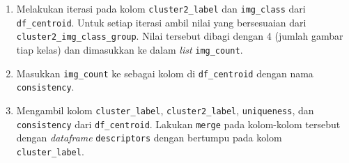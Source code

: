 \begin{enumerate}
	\item Melakukan iterasi pada kolom \texttt{cluster2\_label} dan \texttt{img\_class} dari \texttt{df\_centroid}. Untuk setiap iterasi ambil nilai yang bersesuaian dari \texttt{cluster2\_img\_class\_group}. Nilai tersebut dibagi dengan 4 (jumlah gambar tiap kelas) dan dimasukkan ke dalam \textit{list} \texttt{img\_count}.
	\item Masukkan \texttt{img\_count} ke sebagai kolom di \texttt{df\_centroid} dengan nama \texttt{consistency}.
	\item Mengambil kolom \texttt{cluster\_label}, \texttt{cluster2\_label}, \texttt{uniqueness}, dan \texttt{consistency} dari \texttt{df\_centroid}. Lakukan \texttt{merge} pada kolom-kolom tersebut dengan \textit{dataframe} \texttt{descriptors} dengan bertumpu pada kolom \texttt{cluster\_label}.
\end{enumerate}

